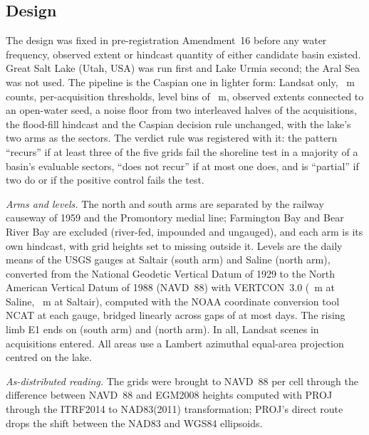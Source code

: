 
\subsection*{Design}
The design was fixed in pre-registration Amendment~16 before any water frequency, observed extent or hindcast quantity of either candidate basin existed. Great Salt Lake (Utah, USA) was run first and Lake Urmia second; the Aral Sea was not used. The pipeline is the Caspian one in lighter form: Landsat only, ~m counts, per-acquisition thresholds, level bins of ~m, observed extents connected to an open-water seed, a noise floor from two interleaved halves of the acquisitions, the flood-fill hindcast and the Caspian decision rule unchanged, with the lake's two arms as the sectors. The verdict rule was registered with it: the pattern ``recurs'' if at least three of the five grids fail the shoreline test in a majority of a basin's evaluable sectors, ``does not recur'' if at most one does, and is ``partial'' if two do or if the positive control fails the test.

\emph{Arms and levels.} The north and south arms are separated by the railway causeway of 1959 and the Promontory medial line; Farmington Bay and Bear River Bay are excluded (river-fed, impounded and ungauged), and each arm is its own hindcast, with grid heights set to missing outside it. Levels are the daily means of the USGS gauges at Saltair (south arm) and Saline (north arm)\citep{usgs_nwis}, converted from the National Geodetic Vertical Datum of 1929 to the North American Vertical Datum of 1988 (NAVD~88) with VERTCON~3.0 (~m at Saline, ~m at Saltair), computed with the NOAA coordinate conversion tool NCAT at each gauge\citep{noaa_ncat}, bridged linearly across gaps of at most  days. The rising limb E1 ends on  (south arm) and  (north arm). In all,  Landsat scenes in  acquisitions entered. All areas use a Lambert azimuthal equal-area projection centred on the lake.

\emph{As-distributed reading.} The grids were brought to NAVD~88 per cell through the difference between NAVD~88 and EGM2008 heights computed with PROJ through the ITRF2014 to NAD83(2011) transformation; PROJ's direct route drops the shift between the NAD83 and WGS84 ellipsoids.

